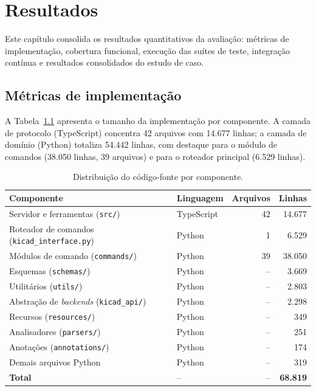 \chapter{Resultados}\label{cap:resultados}

Este capítulo consolida os resultados quantitativos da avaliação: métricas de
implementação, cobertura funcional, execução das suítes de teste, integração
contínua e resultados consolidados do estudo de caso.

\section{Métricas de implementação}

A Tabela~\ref{tab:loc-mono} apresenta o tamanho da implementação por
componente. A camada de protocolo (TypeScript) concentra 42 arquivos com
14.677 linhas; a camada de domínio (Python) totaliza 54.442 linhas, com
destaque para o módulo de comandos (38.050 linhas, 39 arquivos) e para o
roteador principal (6.529 linhas).

\begin{table}[htbp]
\centering
\small
\caption{Distribuição do código-fonte por componente.}
\label{tab:loc-mono}
\begin{tabular}{@{}p{6.0cm}p{2.4cm}r r@{}}
\toprule
\textbf{Componente} & \textbf{Linguagem} & \textbf{Arquivos} & \textbf{Linhas} \\
\midrule
Servidor e ferramentas (\texttt{src/}) & TypeScript & 42 & 14.677 \\
Roteador de comandos (\texttt{kicad\_interface.py}) & Python & 1 & 6.529 \\
Módulos de comando (\texttt{commands/}) & Python & 39 & 38.050 \\
Esquemas (\texttt{schemas/}) & Python & -- & 3.669 \\
Utilitários (\texttt{utils/}) & Python & -- & 2.803 \\
Abstração de \emph{backends} (\texttt{kicad\_api/}) & Python & -- & 2.298 \\
Recursos (\texttt{resources/}) & Python & -- & 349 \\
Analisadores (\texttt{parsers/}) & Python & -- & 251 \\
Anotações (\texttt{annotations/}) & Python & -- & 174 \\
Demais arquivos Python & Python & -- & 319 \\
\midrule
\textbf{Total} & -- & -- & \textbf{68.819} \\
\bottomrule
\end{tabular}
\end{table}

